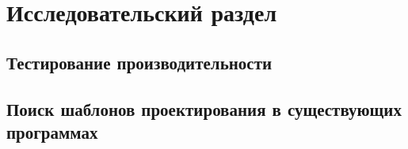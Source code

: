 \chapter{Исследовательский раздел}
\label{cha:research}

\section{Тестирование производительности}
\section{Поиск шаблонов проектирования в существующих программах}
